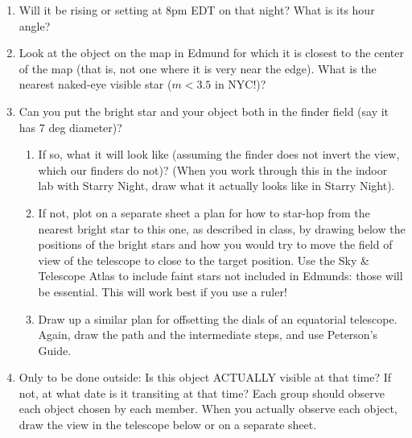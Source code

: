 \begin{enumerate}
\item Will it be rising or setting at 8pm EDT on that night?  What is its
hour angle?
\vspace{40pt}
\item Look at the object on the map in Edmund for which it is closest
to the center of the map (that is, not one where it is very near the
edge). What is the nearest naked-eye visible star ($m<3.5$ in NYC!)?
\vspace{40pt}
\item Can you put the bright star and your object both in the finder
field (say it has 7 deg diameter)? 
\begin{enumerate}
\item If so,  what it will look like
(assuming the finder does not invert the view, which our finders do
not)? (When you work through this in the indoor lab with Starry Night,
draw what it actually looks like in Starry Night).
\vspace{180pt}
\clearpage
\item If not, plot on a separate sheet a plan for how to star-hop from
  the nearest bright star to this one, as described in class, by
  drawing below the positions of the bright stars and how you would
  try to move the field of view of the telescope to close to the
  target position. Use the Sky \& Telescope Atlas to include faint
  stars not included in Edmunds: those will be essential. This will
  work best if you use a ruler!
\item Draw up a similar plan for offsetting the dials of an equatorial
  telescope.  Again, draw the path and the intermediate steps, and use
  Peterson's Guide. 
\end{enumerate}
\vspace{220pt}
\item Only to be done outside: Is this object ACTUALLY visible at that
  time? If not, at what date is it transiting at that time? Each group
  should observe each object chosen by each member.  When you actually
  observe each object, draw the view in the telescope below or on a
  separate sheet.
\end{enumerate}
